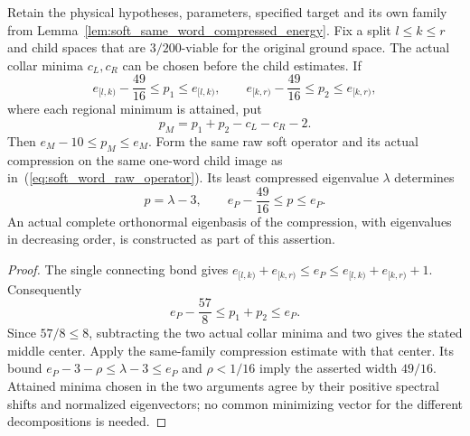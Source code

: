 \begin{lemma}
    \label{lem:soft_word_node_energy_update}
    \leanok
    Retain the physical hypotheses, parameters, specified target and its
    own family from Lemma~\ref{lem:soft_same_word_compressed_energy}.
    Fix a split $l\le k\le r$ and child spaces that are $3/200$-viable
    for the original ground space. The actual collar minima $c_L,c_R$
    can be chosen before the child estimates. If
    \[
        e_{[l,k)}-\frac{49}{16}\le p_1\le e_{[l,k)},\qquad
        e_{[k,r)}-\frac{49}{16}\le p_2\le e_{[k,r)},
    \]
    where each regional minimum is attained, put
    \[
        p_M=p_1+p_2-c_L-c_R-2.
    \]
    Then $e_M-10\le p_M\le e_M$. Form the same raw soft operator
    and its actual compression on the same one-word child image as
    in~(\ref{eq:soft_word_raw_operator}). Its least compressed eigenvalue
    $\lambda$ determines
    \[
        p=\lambda-3,\qquad e_P-\frac{49}{16}\le p\le e_P.
    \]
    An actual complete orthonormal eigenbasis of the compression, with
    eigenvalues in decreasing order, is constructed as part of this assertion.
\end{lemma}
\begin{proof}\leanok
    The single connecting bond gives
    $e_{[l,k)}+e_{[k,r)}\le e_P\le
        e_{[l,k)}+e_{[k,r)}+1$. Consequently
    \[
        e_P-\frac{57}{8}\le p_1+p_2\le e_P.
    \]
    Since $57/8\le8$, subtracting the two actual collar minima and two
    gives the stated middle center. Apply the same-family compression
    estimate with that center. Its bound $e_P-3-\rho\le\lambda-3\le e_P$
    and $\rho<1/16$ imply the asserted width $49/16$.
    Attained minima chosen in the two arguments agree by their positive
    spectral shifts and normalized eigenvectors; no common minimizing
    vector for the different decompositions is needed.
\end{proof}

